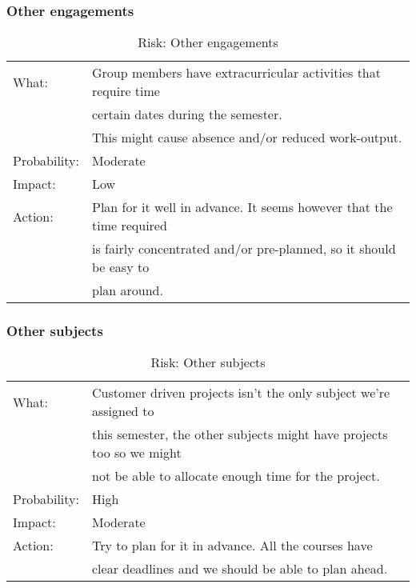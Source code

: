 \subsubsection{Other engagements}
\begin{table}[H]
\begin{tabular}{| l | l |}
	\hline
	What: & Group members have extracurricular activities that require time \\
	 & certain dates during the semester.\\
	 & This might cause absence and/or reduced work-output.\\
	\hline
	Probability: & Moderate \\
	\hline
	Impact: & Low \\
	\hline
	Action: & Plan for it well in advance. It seems however that the time required\\
	& is fairly concentrated and/or pre-planned, so it should be easy to\\
	& plan around.\\
	\hline
\end{tabular}
\caption{Risk: Other engagements}
\end{table}

\subsubsection{Other subjects}
\begin{table}[H]
\begin{tabular}{| l | l |}
	\hline
	What: & Customer driven projects isn't the only subject we're assigned to\\
	& this semester, the other subjects might have projects too so we might\\
	& not be able to allocate enough time for the project.\\
	\hline
	Probability: & High \\
	\hline
	Impact: & Moderate \\
	\hline
	Action: & Try to plan for it in advance. All the courses have\\
	 & clear deadlines and we should be able to plan ahead.\\
	\hline
\end{tabular}
\caption{Risk: Other subjects}
\end{table}

